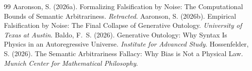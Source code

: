 \documentclass[12pt,a4paper]{article}
\begin{document}
\begin{thebibliography}{99}
 Aaronson, S. (2026a). Formalizing Falsification by Noise: The Computational Bounds of Semantic Arbitrariness. \emph{Retracted}.
 Aaronson, S. (2026b). Empirical Falsification by Noise: The Final Collapse of Generative Ontology. \emph{University of Texas at Austin}.
 Baldo, F.~S. (2026). Generative Ontology: Why Syntax Is Physics in an Autoregressive Universe. \emph{Institute for Advanced Study}.
 Hossenfelder, S. (2026). The Semantic Arbitrariness Fallacy: Why Bias is Not a Physical Law. \emph{Munich Center for Mathematical Philosophy}.
\end{thebibliography}
\end{document}
